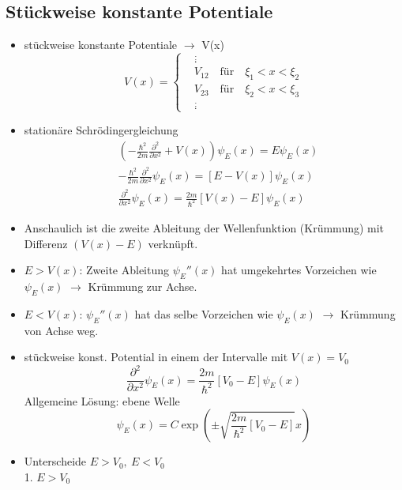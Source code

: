 \documentclass[10pt,article,colorback,accentcolor=tud9d]{scrartcl}
\begin{document}
\subsection{Stückweise konstante Potentiale}
\begin{itemize}
	\item stückweise konstante Potentiale $\rightarrow$ V(x)
    \begin{equation}
    V(x)=\left\{
    \begin{aligned}
    &\stackrel{:}{.}\\
    &V_{12} \quad \text{für} \quad \xi_1<x<\xi_2\\
    &V_{23} \quad \text{für} \quad \xi_2<x<\xi_3\\
    &\stackrel{:}{.}
    \end{aligned}
    \right.
    \end{equation}
  \item stationäre Schrödingergleichung
    \begin{align}
      &\left(-\frac{\hbar^2}{2m}\frac{\partial^2}{\partial x^2}+V(x)\right)\psi_E(x)=E\psi_E(x)\\
      &-\frac{\hbar^2}{2m}\frac{\partial^2}{\partial x^2}\psi_E(x)=\left[E-V(x)\right]\psi_E(x)\\
      &\frac{\partial^2}{\partial x^2}\psi_E(x)=\frac{2m}{\hbar^2}\left[V(x)-E\right]\psi_E(x)
    \end{align}
  \item Anschaulich ist die zweite Ableitung der Wellenfunktion (Krümmung) mit Differenz $(V(x)-E)$ verknüpft.
  \item $E>V(x)$: Zweite Ableitung $\psi_E''(x)$ hat umgekehrtes Vorzeichen wie $\psi_E(x)$ $\rightarrow$ Krümmung zur Achse.
  \item $E<V(x)$: $\psi_E''(x)$ hat das selbe Vorzeichen wie $\psi_E(x)$ $\rightarrow$ Krümmung von Achse weg.
  \item stückweise konst. Potential in einem der Intervalle mit $V(x)=V_0$
    \begin{equation}
    \frac{\partial^2}{\partial x^2}\psi_E(x)=\frac{2m}{\hbar^2}[V_0-E]\psi_E(x)
    \end{equation}
    Allgemeine Lösung: ebene Welle 
    \begin{equation}
    \psi_E(x)=C\exp\left(\pm\sqrt{\frac{2m}{\hbar^2}[V_0-E]}x\right)
    \end{equation}
  \item Unterscheide $E>V_0, \ E<V_0$\\
    1. $E>V_0$\\

\end{itemize}
\end{document}
